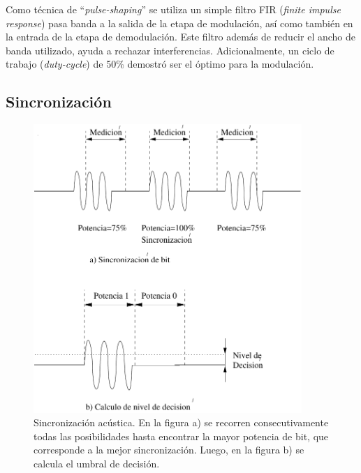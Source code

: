 Como técnica de ``\textit{pulse-shaping}'' se utiliza un simple filtro FIR \cite{oppenheim1989discrete} (\textit{finite impulse response}) pasa banda a la salida de la etapa de modulación, así como también en la entrada de la etapa de demodulación. Este filtro además de reducir el ancho de banda utilizado, ayuda a rechazar interferencias.
Adicionalmente, un ciclo de trabajo (\textit{duty-cycle}) de 50\% demostró ser el óptimo para la modulación.

\subsection{Sincronización}

\begin{figure}[t]
  \centering
    \includegraphics[width=4in]{graphs/acusync.pdf}
\caption {Sincronización acústica. En la figura a) se recorren consecutivamente todas las posibilidades hasta encontrar la mayor potencia de bit, que corresponde a la mejor sincronización. Luego, en la figura b) se calcula el umbral de decisión.}
\label{fig:acusync}
\end{figure}

